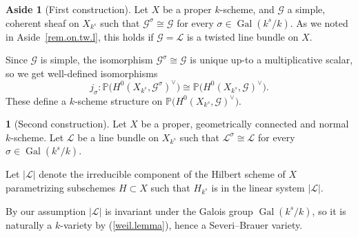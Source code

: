 \documentclass{amsart}
\theoremstyle{definition}
\newtheorem{say}[thm]{}
\newtheorem{aside}[thm]{Aside}
\theoremstyle{remark}
\newcommand{\p}[0]{{\mathbb P}}
\newcommand{\gal}[0]{\operatorname{Gal}}
\begin{document}
\begin{aside}[First construction]\label{|L|.const.1}
  Let $X$ be a proper  $k$-scheme, and   ${\mathcal G}$ a
simple, coherent sheaf 
on $X_{k^s}$ such that ${\mathcal G}^{\sigma}\cong {\mathcal G}$ for every $\sigma\in \gal(k^s/k)$.
As we noted in Aside~\ref{rem.on.tw.l}, this holds
if     ${\mathcal G}={\mathcal L}$ is a twisted line bundle on $X$.

Since  ${\mathcal G}$ is
simple, the isomorphism ${\mathcal G}^{\sigma}\cong {\mathcal G}$
is unique up-to a multiplicative scalar, so we get well-defined
isomorphisms  
$$
j_{\sigma}:\p\bigl(H^0(X_{k^s}, {\mathcal G}^{\sigma})^{\vee}\bigr)\cong
\p\bigl(H^0(X_{k^s}, {\mathcal G})^{\vee}\bigr).
$$
These define a $k$-scheme structure on 
$\p\bigl(H^0(X_{k^s}, {\mathcal G})^{\vee}\bigr) $.
\end{aside}





\begin{say}[Second construction]\label{|L|.const.2}
 Let $X$ be a proper, geometrically connected  and normal  $k$-scheme. Let  ${\mathcal L}$ be a line bundle 
on $X_{k^s}$ such that ${\mathcal L}^{\sigma}\cong {\mathcal L}$ for every $\sigma\in \gal(k^s/k)$.


Let $|{\mathcal L}|$ denote the
irreducible component of the Hilbert scheme  of $X$
parametrizing subschemes $H\subset X$ such that $H_{k^s}$ is in the linear system $|{\mathcal L}|$.

By our assumption   $|{\mathcal L}|$ is invariant under the
Galois group $\gal(k^s/k)$, so it is naturally a $k$-variety
by (\ref{weil.lemma}), hence 
 a Severi--Brauer variety.
\end{say}
\end{document}
